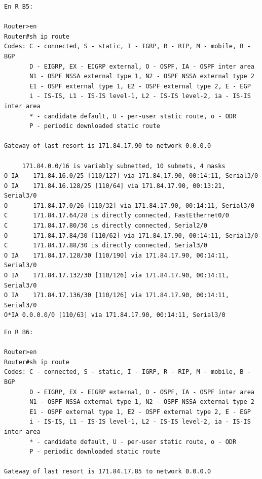 \documentclass[11pt]{article}
\begin{document}
\begin{enumerate}
\begin{mdframed}
\begin{verbatim}
En R B5:

Router>en
Router#sh ip route
Codes: C - connected, S - static, I - IGRP, R - RIP, M - mobile, B - BGP
       D - EIGRP, EX - EIGRP external, O - OSPF, IA - OSPF inter area
       N1 - OSPF NSSA external type 1, N2 - OSPF NSSA external type 2
       E1 - OSPF external type 1, E2 - OSPF external type 2, E - EGP
       i - IS-IS, L1 - IS-IS level-1, L2 - IS-IS level-2, ia - IS-IS inter area
       * - candidate default, U - per-user static route, o - ODR
       P - periodic downloaded static route

Gateway of last resort is 171.84.17.90 to network 0.0.0.0

     171.84.0.0/16 is variably subnetted, 10 subnets, 4 masks
O IA    171.84.16.0/25 [110/127] via 171.84.17.90, 00:14:11, Serial3/0
O IA    171.84.16.128/25 [110/64] via 171.84.17.90, 00:13:21, Serial3/0
O       171.84.17.0/26 [110/32] via 171.84.17.90, 00:14:11, Serial3/0
C       171.84.17.64/28 is directly connected, FastEthernet0/0
C       171.84.17.80/30 is directly connected, Serial2/0
O       171.84.17.84/30 [110/62] via 171.84.17.90, 00:14:11, Serial3/0
C       171.84.17.88/30 is directly connected, Serial3/0
O IA    171.84.17.128/30 [110/190] via 171.84.17.90, 00:14:11, Serial3/0
O IA    171.84.17.132/30 [110/126] via 171.84.17.90, 00:14:11, Serial3/0
O IA    171.84.17.136/30 [110/126] via 171.84.17.90, 00:14:11, Serial3/0
O*IA 0.0.0.0/0 [110/63] via 171.84.17.90, 00:14:11, Serial3/0
\end{verbatim}
\end{mdframed}


\begin{mdframed}
\begin{verbatim}
En R B6:

Router>en
Router#sh ip route
Codes: C - connected, S - static, I - IGRP, R - RIP, M - mobile, B - BGP
       D - EIGRP, EX - EIGRP external, O - OSPF, IA - OSPF inter area
       N1 - OSPF NSSA external type 1, N2 - OSPF NSSA external type 2
       E1 - OSPF external type 1, E2 - OSPF external type 2, E - EGP
       i - IS-IS, L1 - IS-IS level-1, L2 - IS-IS level-2, ia - IS-IS inter area
       * - candidate default, U - per-user static route, o - ODR
       P - periodic downloaded static route

Gateway of last resort is 171.84.17.85 to network 0.0.0.0


\end{verbatim}
\end{mdframed}
\end{enumerate}
\end{document}
